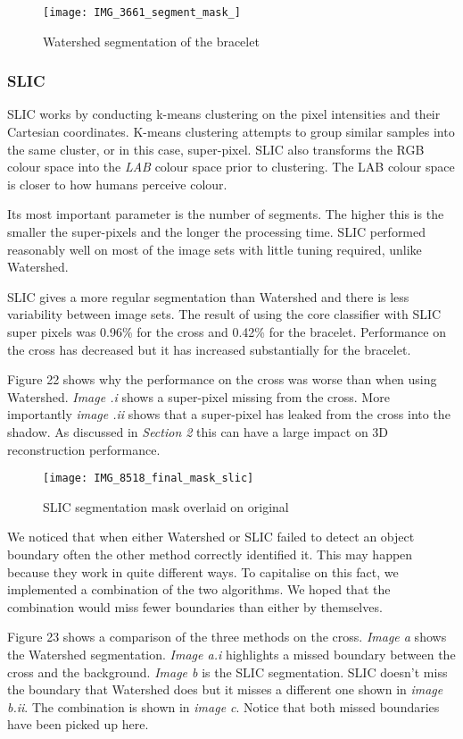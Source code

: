 \documentclass[12pt]{IIBproject}
\begin{document}
\begin{figure}[H]
  
  \centering
    \texttt{[image: IMG\_3661\_segment\_mask\_]}
\caption{Watershed segmentation of the bracelet}
\end{figure}
\subsubsection{SLIC}
SLIC works by conducting k-means clustering on the pixel intensities and their Cartesian coordinates. K-means clustering attempts to group similar samples into the same cluster, or in this case, super-pixel. SLIC also transforms the RGB colour space into the \emph{LAB} colour space prior to clustering. The LAB colour space is closer to how humans perceive colour\cite{mcguire1992reporting}.

 Its most important parameter is the number of segments. The higher this is the smaller the super-pixels and the longer the processing time. SLIC performed reasonably well on most of the image sets with little tuning required, unlike Watershed. 
 
SLIC gives a more regular segmentation than Watershed and there is less variability between image sets. The result of using the core classifier with SLIC super pixels was 0.96\% for the cross and 0.42\% for the bracelet. Performance on the cross has decreased but it has increased substantially for the bracelet.

Figure 22 shows why the performance on the cross was worse than when using Watershed. \emph{Image .i} shows a super-pixel missing from the cross. More importantly \emph{image .ii} shows that a super-pixel has leaked from the cross into the shadow. As discussed in \emph{Section 2} this can have a large impact on 3D reconstruction performance.
\begin{figure}[H]
  
  \centering
    \texttt{[image: IMG\_8518\_final\_mask\_slic]}
    \caption{SLIC segmentation mask overlaid on original}
\end{figure}
We noticed that when either Watershed or SLIC failed to detect an object boundary  often the other method correctly identified it. This may happen because they work in quite different ways. To capitalise on this fact, we implemented a combination of the two algorithms. We hoped that the combination would miss fewer boundaries than either by themselves. 

Figure 23 shows a comparison of the three methods on the cross. \emph{Image a} shows the Watershed segmentation. \emph{Image a.i} highlights a missed boundary between the cross and the background. \emph{Image b} is the SLIC segmentation. SLIC doesn't miss the boundary that Watershed does but it misses a different one shown in \emph{image b.ii}. The combination is shown in \emph{image c}. Notice that both missed boundaries have been picked up here.
\end{document}
